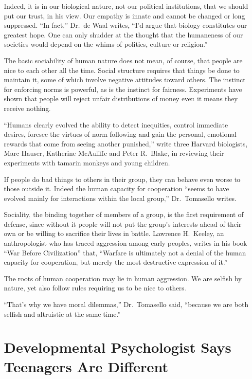 ﻿\documentclass[12pt]{article}
\begin{document}
Indeed, it is in our biological nature, not our political institutions, that we should put our
trust, in his view. Our empathy is innate and cannot be changed or long suppressed. ``In fact,''
Dr.~de Waal writes, ``I'd argue that biology constitutes our greatest hope. One can only shudder at
the thought that the humaneness of our societies would depend on the whims of politics, culture or
religion.''

The basic sociability of human nature does not mean, of course, that people are nice to each other
all the time. Social structure requires that things be done to maintain it, some of which involve
negative attitudes toward others. The instinct for enforcing norms is powerful, as is the instinct
for fairness. Experiments have shown that people will reject unfair distributions of money even it
means they receive nothing.

``Humans clearly evolved the ability to detect inequities, control immediate desires, foresee the
virtues of norm following and gain the personal, emotional rewards that come from seeing another
punished,'' write three Harvard biologists, Marc Hauser, Katherine McAuliffe and Peter R.~Blake, in
reviewing their experiments with tamarin monkeys and young children.

If people do bad things to others in their group, they can behave even worse to those outside it.
Indeed the human capacity for cooperation ``seems to have evolved mainly for interactions within the
local group,'' Dr.~Tomasello writes.

Sociality, the binding together of members of a group, is the first requirement of defense, since
without it people will not put the group's interests ahead of their own or be willing to sacrifice
their lives in battle. Lawrence H.~Keeley, an anthropologist who has traced aggression among early
peoples, writes in his book ``War Before Civilization'' that, ``Warfare is ultimately not a denial
of the human capacity for cooperation, but merely the most destructive expression of it.''

The roots of human cooperation may lie in human aggression. We are selfish by nature, yet also
follow rules requiring us to be nice to others.

``That's why we have moral dilemmas,'' Dr.~Tomasello said, ``because we are both selfish and
altruistic at the same time.''

\section{Developmental Psychologist Says Teenagers Are Different}
\end{document}
